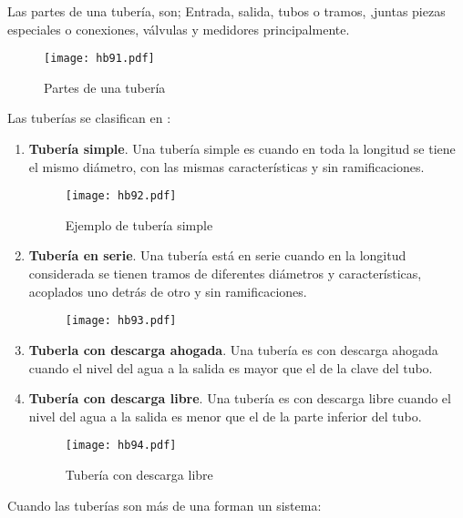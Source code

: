 Las partes de una tubería, son; Entrada, salida, tubos o tramos, ,juntas piezas especiales o conexiones, válvulas y medidores principalmente.

\begin{figure}[h!]
\centering
  \texttt{[image: hb91.pdf]}
  \caption{Partes de una tubería}
  \label{hb91}
\end{figure}

Las tuberías se clasifican en :

\begin{enumerate}
    \item \textbf{Tubería simple}. Una tubería simple es cuando en toda la longitud se tiene el mismo diámetro, con las mismas características y sin ramificaciones.
    \begin{figure}[h!]
    \centering
      \texttt{[image: hb92.pdf]}
      \caption{Ejemplo de tubería simple}
      \label{hb92}
    \end{figure}
    \item \textbf{Tubería en serie}. Una tubería está en serie cuando en la longitud considerada se tienen tramos de diferentes diámetros y características, acoplados uno detrás de otro y sin ramificaciones.
    \begin{figure}[h!]
    \centering
      \texttt{[image: hb93.pdf]}
      \caption{}
      \label{hb93}
    \end{figure}
    \item \textbf{Tuberla con descarga ahogada}. Una tubería es con descarga ahogada cuando el nivel del agua a la salida es mayor que el de la clave del tubo.
    \item \textbf{Tubería con descarga libre}. Una tubería es con descarga libre cuando el nivel del agua a la salida es menor que el de la parte inferior del tubo.
    \begin{figure}[h!]
    \centering
      \texttt{[image: hb94.pdf]}
      \caption{Tubería con descarga libre}
      \label{hb94}
    \end{figure}
\end{enumerate}
Cuando las tuberías son más de una forman un sistema:
